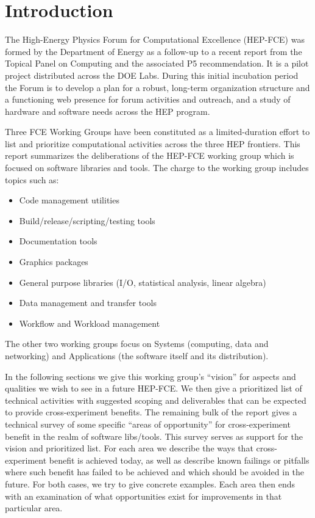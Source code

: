 \section{Introduction}

The High-Energy Physics Forum for Computational Excellence (HEP-FCE)
was formed by the Department of Energy as a follow-up to a recent
report from the Topical Panel on Computing\cite{topicalpanel} and the
associated P5 recommendation\cite{p5}.
%
It is a  pilot project distributed across the DOE Labs.  
%
During this initial incubation period the Forum is to develop a plan
for a robust, long-term organization structure and a functioning web
presence for forum activities and outreach, and a study of hardware
and software needs across the HEP program.

Three FCE Working Groups have been constituted as a limited-duration effort 
to list and prioritize computational activities across the three HEP frontiers.
This report summarizes the deliberations of the HEP-FCE working group which 
is focused on software libraries and tools. The charge to the working group 
includes topics such as:

\begin{itemize}
\item Code management utilities
\item Build/release/scripting/testing tools
\item Documentation tools
\item Graphics packages
\item General purpose libraries (I/O, statistical analysis, linear algebra)
\item  Data management and transfer tools
\item  Workflow and Workload management
\end{itemize}

The other two working groups focus on Systems (computing, data and networking)
and Applications (the software itself and its distribution).   

In the following sections we give this working group's ``vision'' for
aspects and qualities we wish to see in a future HEP-FCE.  We then
give a prioritized list of technical activities with suggested scoping
and deliverables that can be expected to provide cross-experiment
benefits.  The remaining bulk of the report gives a technical survey of some
specific ``areas of opportunity'' for cross-experiment benefit in the
realm of software libs/tools.  This survey serves as support for the
vision and prioritized list.  For each area we describe the ways that
cross-experiment benefit is achieved today, as well as describe known
failings or pitfalls where such benefit has failed to be achieved and
which should be avoided in the future.  For both cases, we try to give
concrete examples.  Each area then ends with an examination of what
opportunities exist for improvements in that particular area.


